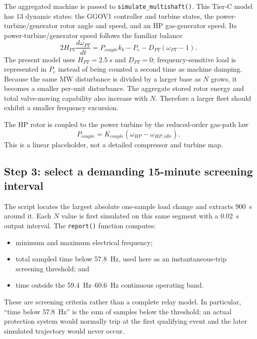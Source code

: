 \documentclass[11pt]{article}
\begin{document}
The aggregated machine is passed to \texttt{simulate\_multishaft()}.  This
Tier-C model has 13 dynamic states: the GGOV1 controller and turbine states,
the power-turbine/generator rotor angle and speed, and an HP gas-generator
speed.  Its power-turbine/generator speed follows the familiar balance
\begin{equation}
  2H_{PT}\frac{d\omega_{PT}}{dt}
  =P_{couple}k_b-P_e-D_{PT}(\omega_{PT}-1).
  \label{eq:fleet-swing}
\end{equation}
The present model uses $H_{PT}=\SI{2.5}{s}$ and $D_{PT}=0$; frequency-sensitive
load is represented in $P_e$ instead of being counted a second time as
machine damping.  Because the same MW disturbance is divided by a larger
base as $N$ grows, it becomes a smaller per-unit disturbance.  The aggregate
stored rotor energy and total valve-moving capability also increase with
$N$.  Therefore a larger fleet should exhibit a smaller frequency excursion.

The HP rotor is coupled to the power turbine by the reduced-order gas-path law
\begin{equation}
  P_{couple}=K_{couple}(\omega_{HP}-\omega_{HP,idle}).
\end{equation}
This is a linear placeholder, not a detailed compressor and turbine map.

\subsection{Step 3: select a demanding 15-minute screening interval}

The script locates the largest absolute one-sample load change and extracts
\SI{900}{s} around it.  Each $N$ value is first simulated on this same segment
with a \SI{0.02}{s} output interval.  The \texttt{report()} function computes:
\begin{itemize}
  \item minimum and maximum electrical frequency;
  \item total sampled time below \SI{57.8}{Hz}, used here as an
        instantaneous-trip screening threshold; and
  \item time outside the \SIrange{59.4}{60.6}{Hz} continuous operating band.
\end{itemize}
These are screening criteria rather than a complete relay model.  In
particular, ``time below \SI{57.8}{Hz}'' is the sum of samples below the
threshold; an actual protection system would normally trip at the first
qualifying event and the later simulated trajectory would never occur.
\end{document}
